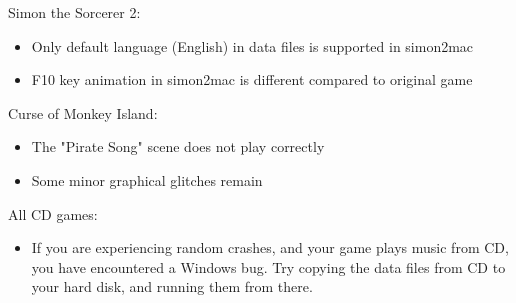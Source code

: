 Simon the Sorcerer 2:
  \begin{itemize}
  \item Only default language (English) in data files is supported in simon2mac
  \item F10 key animation in simon2mac is different compared to
        original game
  \end{itemize}
Curse of Monkey Island:
  \begin{itemize}
  \item The "Pirate Song" scene does not play correctly 
  \item Some minor graphical glitches remain
  \end{itemize}
All CD games:
  \begin{itemize}
  \item If you are experiencing random crashes, and your game
                 plays music from CD, you have encountered a Windows bug.
                 Try copying the data files from CD to your hard disk, and
                 running them from there.
  \end{itemize}